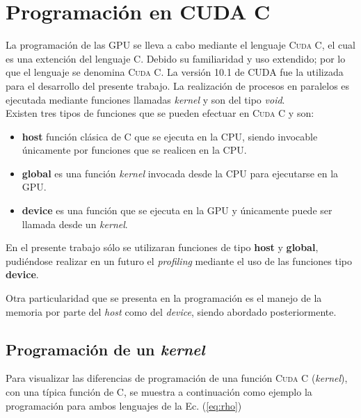 \section{Programación en CUDA C}

La programación de las GPU se lleva a cabo mediante el lenguaje \textsc{Cuda C}, el cual es una extención del lenguaje \textsc{C}. Debido su familiaridad y uso extendido; por lo que el lenguaje se denomina \textsc{Cuda C}. La versión 10.1 de CUDA fue la utilizada para el desarrollo del presente trabajo. La realización de procesos en paralelos es ejecutada mediante funciones llamadas \textit{kernel} y son del tipo \textit{void}.
\\

Existen tres tipos de funciones que se pueden efectuar en \textsc{Cuda C} y son:

\begin{itemize}
	
	\item \textbf{host} función clásica de C que se ejecuta en la CPU, siendo invocable únicamente por funciones que se realicen en la CPU. 

	\item \textbf{global} es una función \textit{kernel} invocada desde la CPU para ejecutarse en la GPU. 
	
	\item \textbf{device} es una función que se ejecuta en la GPU y únicamente puede ser llamada desde un \textit{kernel}.
	
\end{itemize}

En el presente trabajo sólo se utilizaran funciones de tipo \textbf{host} y \textbf{global}, pudiéndose realizar en un futuro el  \textit{profiling} mediante el uso de las funciones tipo \textbf{device}.

Otra particularidad que se presenta en la programación es el manejo de la memoria por parte del \textit{host} como del \textit{device}, siendo abordado posteriormente.


\subsection{Programación de un \textit{kernel}}

Para visualizar las diferencias de programación de una función \textsc{Cuda C} (\textit{kernel}), con una típica función de \textsc{C}, se muestra a continuación como ejemplo la programación para ambos lenguajes de la Ec. (\ref{eq:rho})


